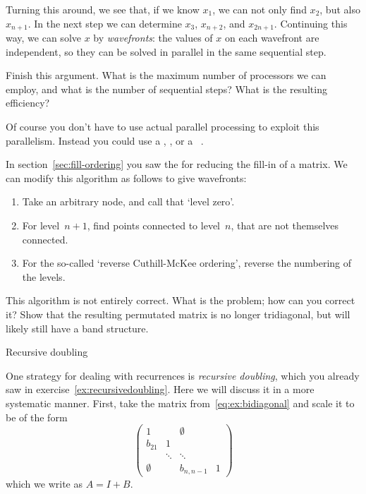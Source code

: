 Turning this around, we see that, if we know $x_1$, we can not only
find $x_2$, but also $x_{n+1}$. In the next step we can determine
$x_3$, $x_{n+2}$, and $x_{2n+1}$. Continuing this way, we can solve
$x$ by \emph{wavefronts}: the values of $x$ on each wavefront are
independent, so they can be solved in parallel in the same sequential
step.

\begin{exercise}
  Finish this argument. What is the maximum number of processors we
  can employ, and what is the number of sequential steps? What is the
  resulting efficiency?
\end{exercise}

Of course you don't have to use actual parallel processing
to exploit this parallelism. Instead you could use a
, ,
or a ~\cite{Liu:cudasw2009}.

In section~\ref{sec:fill-ordering} you saw the
 for reducing the fill-in of a
matrix. We can modify this algorithm as follows to give wavefronts:
\begin{enumerate}
\item Take an arbitrary node, and call that `level zero'.
\item For level~$n+1$, find points connected to
  level~$n$, that are not themselves connected.
\item For the so-called `reverse Cuthill-McKee ordering', reverse the
  numbering of the levels.
\end{enumerate}
\begin{exercise}
  This algorithm is not entirely correct. What is the problem; how can
  you correct it? Show that the resulting permutated matrix is no
  longer tridiagonal, but will likely still have a band structure.
\end{exercise}

 {Recursive doubling}
\label{sec:recdouble}

One strategy for dealing with recurrences is
\emph{recursive doubling}, which you already saw in
exercise~\ref{ex:recursivedoubling}. Here we will discuss it in a more
systematic manner. First, take the matrix
from~\eqref{eq:ex:bidiagonal} and scale it to be of the form
\[ 
  \begin{pmatrix}
    1&&\emptyset\\ b_{21}&1\\ &\ddots&\ddots\\ 
    \emptyset&&b_{n,n-1}&1
  \end{pmatrix}
\]
which we write as $A=I+B$.

